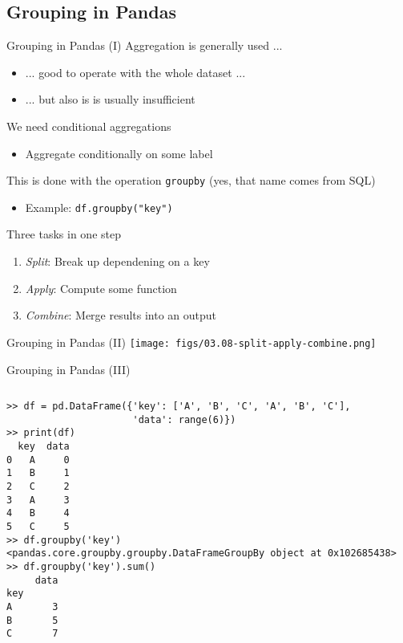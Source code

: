 \documentclass[10pt,compress]{beamer} %
\begin{document}
\subsection{Grouping in Pandas}
\begin{frame}{Grouping in Pandas (I)}
		Aggregation is generally used ...
		\begin{itemize}
			\item ... good to operate with the whole dataset ...
			\item ... but also is is usually insufficient
		\end{itemize}
		We need conditional aggregations
		\begin{itemize}
			\item Aggregate conditionally on some label
		\end{itemize}
		This is done with the operation \texttt{groupby} (yes, that name comes from SQL)
		\begin{itemize}
			\item Example: \texttt{df.groupby("key")}
		\end{itemize}
		Three tasks in one step
		\begin{enumerate}
			\item \textit{Split}: Break up dependening on a key
			\item \textit{Apply}: Compute some function
			\item \textit{Combine}: Merge results into an output
		\end{enumerate}
\end{frame}

\begin{frame}{Grouping in Pandas (II)}
	\centering \texttt{[image: figs/03.08-split-apply-combine.png]}\\
\end{frame}

\begin{frame}[fragile]{Grouping in Pandas (III)}
	\vspace{-0.5cm}
	\begin{columns}
 	   \column{\textwidth}
		\begin{exampleblock}{}
		\vspace{-0.2cm} 
			\begin{lstlisting}
>> df = pd.DataFrame({'key': ['A', 'B', 'C', 'A', 'B', 'C'],
                      'data': range(6)})
>> print(df)
  key  data
0   A     0
1   B     1
2   C     2
3   A     3
4   B     4
5   C     5
>> df.groupby('key')
<pandas.core.groupby.groupby.DataFrameGroupBy object at 0x102685438>
>> df.groupby('key').sum()
     data
key      
A       3
B       5
C       7
\end{lstlisting}
			\vspace{-0.2cm} 
		\end{exampleblock}
	\end{columns}
\end{frame}
\end{document}
